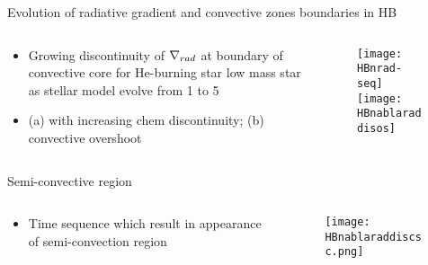 \begin{frame}{Evolution of radiative gradient and convective zones boundaries in HB}
\begin{columns}[T]
\begin{column}{0.5\textwidth}
\begin{itemize}
\item Growing discontinuity of $\nabla_{rad}$ at boundary of convective core for He-burning star low mass star as stellar model evolve from 1 to 5
\item (a) with increasing chem discontinuity; (b) convective overshoot
\end{itemize}
\end{column}
\begin{column}{0.5\textwidth}
\begin{figure}[!ht]
\texttt{[image: HBnrad-seq]}\label{fig:HBnrad-seq}	\texttt{[image: HBnablaraddisos]}\label{fig:HBnablaraddisos}
\end{figure}
\end{column}
\end{columns}
\end{frame}

\begin{frame}{Semi-convective region}
\begin{columns}[T]
\begin{column}{0.5\textwidth}
\begin{itemize}
\item Time sequence which result in appearance of semi-convection region
\end{itemize}
\end{column}
\begin{column}{0.5\textwidth}
\begin{figure}[!ht]
\texttt{[image: HBnablaraddiscsc.png]}\label{fig:HBnablaraddiscsc.png}
\end{figure}
\end{column}\end{columns}
\end{frame}

